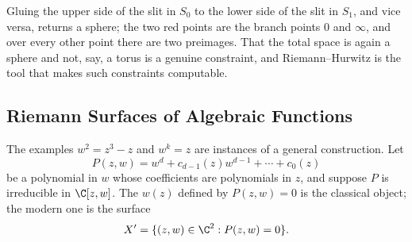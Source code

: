 \begin{center}
\end{center}

Gluing the upper side of the slit in $S_0$ to the lower side of the slit in $S_1$, and
vice versa, returns a sphere; the two red points are the branch points $0$ and $\infty$,
and over every other point there are two preimages. That the total space is again a
sphere and not, say, a torus is
a genuine constraint, and Riemann--Hurwitz is the tool that makes such constraints
computable.

\subsection{Riemann Surfaces of Algebraic Functions}\label{subsec:algebraic}

The examples $w^2 = z^3 - z$ and $w^k = z$ are instances of a general construction. Let
$$
P(z,w) = w^d + c_{d-1}(z)w^{d-1} + \cdots + c_0(z)
$$
be a polynomial in $w$ whose coefficients are polynomials in $z$, and suppose $P$ is
irreducible in $\C[z,w]$. The  $w(z)$ defined by $P(z,w)=0$ is
the classical object; the modern one is the surface
$$
X' = \{(z,w) \in \C^2 : P(z,w) = 0\}.
$$


